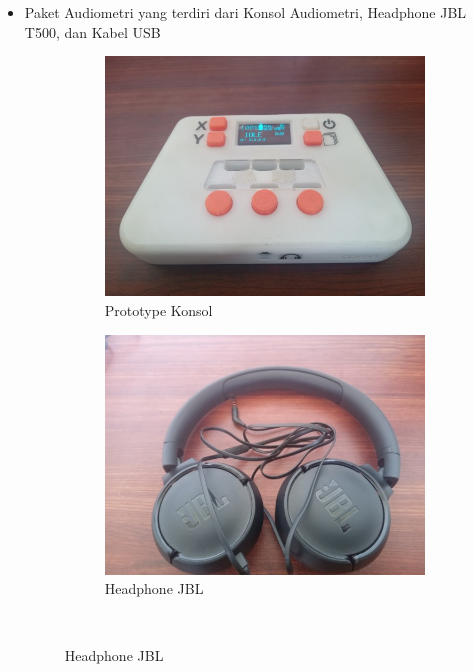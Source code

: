 \documentclass{article}
\begin{document}
\begin{itemize}
		\item Paket Audiometri yang terdiri dari Konsol Audiometri, Headphone JBL T500, dan Kabel USB
		
		\begin{figure}[H]
			\centering
			\begin{subfigure}[]{.35\textwidth}
				\includegraphics[width=\textwidth]{images/proto}
				\caption{Prototype Konsol}
			\end{subfigure}
			\begin{subfigure}[]{.25\textwidth}
				\includegraphics[width=\textwidth]{images/jbl}
				\caption{Headphone JBL}
			\end{subfigure}
			\\

\end{figure}
\end{itemize}
\end{document}
